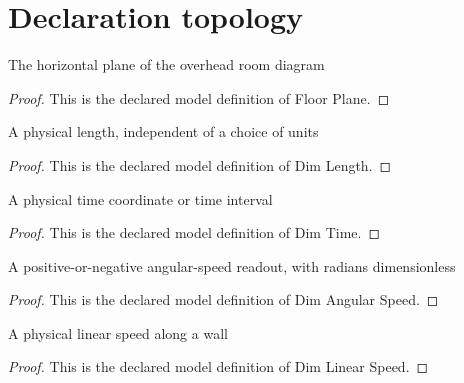 \section{Declaration topology}
\begin{definition}
  \label{def:physics:phyx-mini-0025:phyxminiproblems-problemphyxmini0025-floorplane}
  The horizontal plane of the overhead room diagram
\end{definition}
\begin{proof}
  This is the declared model definition of Floor Plane.
\end{proof}
\begin{definition}
  \label{def:physics:phyx-mini-0025:phyxminiproblems-problemphyxmini0025-dimlength}
  A physical length, independent of a choice of units
\end{definition}
\begin{proof}
  This is the declared model definition of Dim Length.
\end{proof}
\begin{definition}
  \label{def:physics:phyx-mini-0025:phyxminiproblems-problemphyxmini0025-dimtime}
  A physical time coordinate or time interval
\end{definition}
\begin{proof}
  This is the declared model definition of Dim Time.
\end{proof}
\begin{definition}
  \label{def:physics:phyx-mini-0025:phyxminiproblems-problemphyxmini0025-dimangularspeed}
  A positive-or-negative angular-speed readout, with radians dimensionless
\end{definition}
\begin{proof}
  This is the declared model definition of Dim Angular Speed.
\end{proof}
\begin{definition}
  \label{def:physics:phyx-mini-0025:phyxminiproblems-problemphyxmini0025-dimlinearspeed}
  A physical linear speed along a wall
\end{definition}
\begin{proof}
  This is the declared model definition of Dim Linear Speed.
\end{proof}
